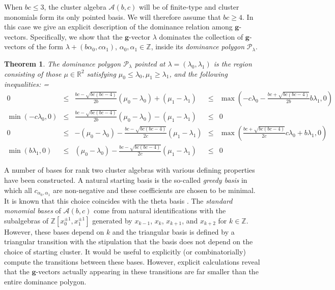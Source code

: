 \documentclass{amsart}
\newtheorem{theorem}{Theorem}
\numberwithin{theorem}{section}
\newcommand{\bfg}{\boldsymbol{g}}
\newcommand{\cA}{\mathcal{A}}
\newcommand{\cP}{\mathcal{P}}
\newcommand{\RR}{\mathbb{R}}
\newcommand{\ZZ}{\mathbb{Z}}
\begin{document}
  When $bc\le3$, the cluster algebra $\cA(b,c)$ will be of finite-type and cluster monomials form its only pointed basis.
  We will therefore assume that $bc\ge4$.
  In this case we give an explicit description of the dominance relation among $\bfg$-vectors.
  Specifically, we show that the $\bfg$-vector $\lambda$ dominates the collection of $\bfg$-vectors of the form $\lambda+(b \alpha_0 ,c \alpha_1)$, $\alpha_0,\alpha_1\in\ZZ$, inside its \emph{dominance polygon} $\cP_\lambda$.
  \begin{theorem}
    \label{th:dominance inequalities}
    The dominance polygon $\cP_\lambda$ pointed at $\lambda=(\lambda_0,\lambda_1)$ is the region consisting of those $\mu\in\RR^2$ satisfying $\mu_0 \leq \lambda_0, \mu_1 \geq\lambda_1$, and the following inequalities:
    {
      \everymath={\displaystyle}
      \def\arraystretch{2.8}
      \[
        \begin{array}{rcccl}
          0 & \leq & \frac{b c-\sqrt{b c (b c-4)}}{2 b}(\mu_0-\lambda_0)+(\mu_1-\lambda_1) & \leq & \max\left(-c\lambda_0-\frac{b c+\sqrt{b c (b c-4)}}{2b}b\lambda_1,0\right)
          \\
          \min\left(-c\lambda_0,0\right) & \leq & \frac{b c-\sqrt{b c (b c-4)}}{2 b}(\mu_0-\lambda_0)-(\mu_1-\lambda_1) & \leq & 0
          \\
          0 & \leq &  -(\mu_0-\lambda_0)-\frac{b c-\sqrt{b c (b c-4)}}{2 c}(\mu_1-\lambda_1) & \leq & \max\left(\frac{b c+\sqrt{b c (b c-4)}}{2c}c\lambda_0+b\lambda_1,0\right)
          \\
          \min\left(b \lambda_1,0\right) & \leq & (\mu_0-\lambda_0) - \frac{b c-\sqrt{b c (b c-4)}}{2 c} (\mu_1-\lambda_1) & \leq & 0
        \end{array}
      \]
    }
  \end{theorem}

  A number of bases for rank two cluster algebras with various defining properties have been constructed.
  A natural starting basis is the so-called \emph{greedy basis} in which all $c_{\alpha_0,\alpha_1}$ are non-negative and these coefficients are chosen to be minimal.
  It is known that this choice coincides with the theta basis \cite{GHKK, CGMMRSW}.
  The \emph{standard monomial bases} of $\cA(b,c)$ come from natural identifications with the subalgebras of $\ZZ[x_0^{\pm1},x_1^{\pm1}]$ generated by $x_{k-1}$, $x_k$, $x_{k+1}$, and $x_{k+2}$ for $k\in\ZZ$.
  However, these bases depend on $k$ and the triangular basis is defined by a triangular transition with the stipulation that the basis does not depend on the choice of starting cluster.
  It would be useful to explicitly (or combinatorially) compute the transitions between these bases.
  However, explicit calculations reveal that the $\bfg$-vectors actually appearing in these transitions are far smaller than the entire dominance polygon.
\end{document}

